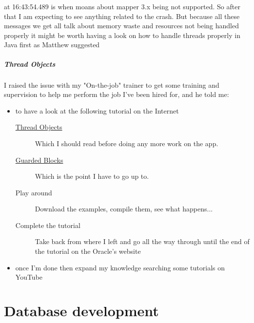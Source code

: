 \documentclass[a4paper,12pt]{book}
\begin{document}
at 16:43:54.489 is when moans about mapper 3.x being not supported. So after that I am expecting to see anything related to the crash. But because all these messages we get all talk about memory waste and resources not being handled properly it might be worth having a look on how to handle threads properly in Java first as Matthew suggested

\subsubsection{Thread Objects}
%
%
I raised the issue with my "On-the-job" trainer to get some training and supervision to help me perform the job I've been hired for, and he told me:

\begin{itemize}
\item{to have a look at the following tutorial on the Internet}

   \begin{description}
   \item[\href{https://docs.oracle.com/javase/tutorial/essential/concurrency/threads.html}{Thread Objects}]{Which I should read before doing any more work on the app.}
   \item[\href{https://docs.oracle.com/javase/tutorial/essential/concurrency/guardmeth.html}{Guarded Blocks}]{Which is the point I have to go up to.}
   \item[Play around]{Download the examples, compile them, see what happens...}
   \item[Complete the tutorial]{Take back from where I left and go all the way through until the end of the tutorial on the Oracle's website}
   \end{description}

\item{once I'm done then expand my knowledge searching some tutorials on YouTube}
\end{itemize}   
\part{Database development}
\end{document}
